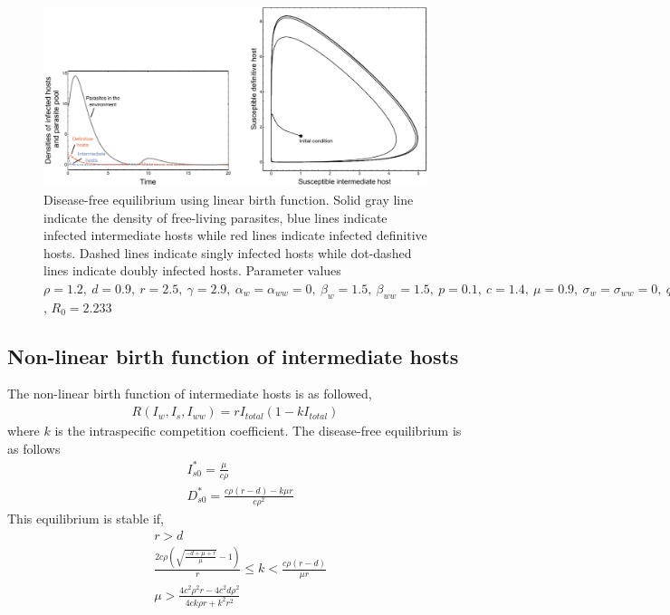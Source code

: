 \documentclass[11pt]{article}
\begin{document}
\begin{figure}
\includegraphics[width=\textwidth]{Figures/diseasefree_linear.pdf}
\caption{Disease-free equilibrium using linear birth function. Solid gray line indicate the density of free-living parasites, blue lines indicate infected intermediate hosts while red lines indicate infected definitive hosts. Dashed lines indicate singly infected hosts while dot-dashed lines indicate doubly infected hosts. Parameter values  $\rho = 1.2, \  d = 0.9, \  r = 2.5, \ \gamma = 2.9, \ \alpha_w =  \alpha_{ww} =  0, \ \beta_w  = 1.5, \ \beta_{ww} = 1.5, \ p = 0.1,  \ c = 1.4, \ \mu = 0.9,  \ \sigma_w = \sigma_{ww} = 0, \ q = 0.01, \  f_w = 6.5, \  f_{ww} = 7.5, \ \delta = 0.9$, $R_0 = 2.233$ } 
\label{fig:diseasefree:linear}
\end{figure}

\subsection*{Non-linear birth function of intermediate hosts}
The non-linear birth function of intermediate hosts is as followed,
\begin{align*}
R(I_w, I_s,I_{ww}) = r I_{total} (1 - k I_{total})
\end{align*}
%
where $k$ is the intraspecific competition coefficient. 
The disease-free equilibrium is as follows
%
\begin{align*}
& I_{s0}^* = \frac{\mu}{c \rho } \\
& D_{s0}^* = \frac{c \rho  (r-d) - k \mu  r}{c \rho ^2}
\end{align*}
%
This equilibrium is stable if,
%
\begin{align*}
& r > d \\
& \frac{2 c \rho  \left(\sqrt{\frac{-d+\mu +r}{\mu }}-1\right)}{r}\leq k < \frac{c \rho  (r-d)}{\mu  r} \\
& \mu >\frac{4 c^2 \rho ^2 r - 4 c^2 d \rho ^2}{4 c k \rho r + k^2 r^2}
\end{align*}
\end{document}
